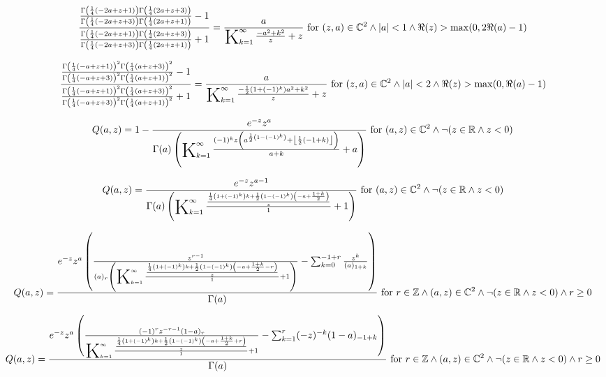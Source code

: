 \documentclass{article}
\newcommand{\bigK}{\mathop{\raisebox{-5pt}{\huge K}}}
\begin{document}
\[\frac{\frac{\Gamma \left(\frac{1}{4} (-2 a+z+1)\right) \Gamma \left(\frac{1}{4} (2 a+z+3)\right)}{\Gamma \left(\frac{1}{4} (-2 a+z+3)\right) \Gamma \left(\frac{1}{4} (2 a+z+1)\right)}-1}{\frac{\Gamma \left(\frac{1}{4} (-2 a+z+1)\right) \Gamma \left(\frac{1}{4} (2 a+z+3)\right)}{\Gamma \left(\frac{1}{4} (-2 a+z+3)\right) \Gamma \left(\frac{1}{4} (2 a+z+1)\right)}+1}=\frac{a}{\bigK_{k=1}^{\infty}\frac{-a^2+k^2}{z}+z}\text{ for }(z,a)\in \mathbb{C}^2\land \left| a\right| <1\land \Re(z)>\max (0,2 \Re(a)-1)\] 

\[\frac{\frac{\Gamma \left(\frac{1}{4} (-a+z+1)\right)^2 \Gamma \left(\frac{1}{4} (a+z+3)\right)^2}{\Gamma \left(\frac{1}{4} (-a+z+3)\right)^2 \Gamma \left(\frac{1}{4} (a+z+1)\right)^2}-1}{\frac{\Gamma \left(\frac{1}{4} (-a+z+1)\right)^2 \Gamma \left(\frac{1}{4} (a+z+3)\right)^2}{\Gamma \left(\frac{1}{4} (-a+z+3)\right)^2 \Gamma \left(\frac{1}{4} (a+z+1)\right)^2}+1}=\frac{a}{\bigK_{k=1}^{\infty}\frac{-\frac{1}{2} \left(1+(-1)^k\right) a^2+k^2}{z}+z}\text{ for }(z,a)\in \mathbb{C}^2\land \left| a\right| <2\land \Re(z)>\max (0,\Re(a)-1)\] 

\[Q(a,z)=1-\frac{e^{-z} z^a}{\Gamma (a) \left(\bigK_{k=1}^{\infty}\frac{(-1)^k z \left(a^{\frac{1}{2} \left(1-(-1)^k\right)}+\left\lfloor \frac{1}{2} (-1+k)\right\rfloor \right)}{a+k}+a\right)}\text{ for }(a,z)\in \mathbb{C}^2\land \neg (z\in \mathbb{R}\land z<0)\] 

\[Q(a,z)=\frac{e^{-z} z^{a-1}}{\Gamma (a) \left(\bigK_{k=1}^{\infty}\frac{\frac{\frac{1}{4} \left(1+(-1)^k\right) k+\frac{1}{2} \left(1-(-1)^k\right) \left(-a+\frac{1+k}{2}\right)}{z}}{1}+1\right)}\text{ for }(a,z)\in \mathbb{C}^2\land \neg (z\in \mathbb{R}\land z<0)\] 

\[Q(a,z)=\frac{e^{-z} z^a \left(\frac{z^{r-1}}{(a)_r \left(\bigK_{k=1}^{\infty}\frac{\frac{\frac{1}{4} \left(1+(-1)^k\right) k+\frac{1}{2} \left(1-(-1)^k\right) \left(-a+\frac{1+k}{2}-r\right)}{z}}{1}+1\right)}-\sum _{k=0}^{-1+r} \frac{z^k}{(a)_{1+k}}\right)}{\Gamma (a)}\text{ for }r\in \mathbb{Z}\land (a,z)\in \mathbb{C}^2\land \neg (z\in \mathbb{R}\land z<0)\land r\geq 0\] 

\[Q(a,z)=\frac{e^{-z} z^a \left(\frac{(-1)^r z^{-r-1} (1-a)_r}{\bigK_{k=1}^{\infty}\frac{\frac{\frac{1}{4} \left(1+(-1)^k\right) k+\frac{1}{2} \left(1-(-1)^k\right) \left(-a+\frac{1+k}{2}+r\right)}{z}}{1}+1}-\sum _{k=1}^r (-z)^{-k} (1-a)_{-1+k}\right)}{\Gamma (a)}\text{ for }r\in \mathbb{Z}\land (a,z)\in \mathbb{C}^2\land \neg (z\in \mathbb{R}\land z<0)\land r\geq 0\] 
\end{document}
